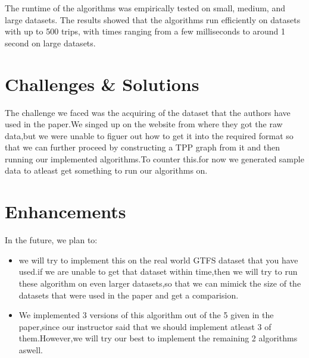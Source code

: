 \documentclass[12pt]{article}
\begin{document}
The runtime of the algorithms was empirically tested on small, medium, and large datasets. The results showed that the algorithms run efficiently on datasets with up to 500 trips, with times ranging from a few milliseconds to around 1 second on large datasets.



\section{Challenges \& Solutions}

The challenge we faced  was the acquiring of the dataset that the authors have used in the paper.We singed up on the website from where they got the raw data,but we were unable to figuer out how to get it into the required format so that we can further proceed by constructing a TPP graph from it and then running our implemented algorithms.To counter this.for now we generated sample data to atleast get something to run our algorithms on.




\section{Enhancements}
In the future, we plan to:
\begin{itemize}
    \item we will try to implement this on the real world GTFS dataset that you have used.if we are unable to get that dataset within time,then we will try to run these algorithm on even larger datasets,so that we can mimick the size of the datasets that were used in the paper and get a comparision.

    \item We implemented 3 versions of this algorithm out of the 5 given in the paper,since our instructor said that we should implement atleast 3 of them.However,we will try our best to implement the remaining 2 algorithms aswell.
\end{itemize}
\end{document}
